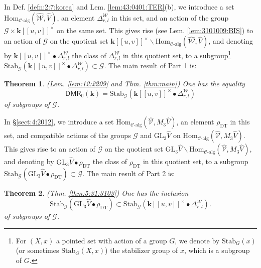 \documentclass[10pt]{amsart}
\newtheorem{thm}{Theorem}[section]
\numberwithin{equation}{subsection}
\begin{document}
In Def. \ref{defn:2:7:korea} and Lem. \ref{lem:43:0401:TER}(b), we introduce a set $\mathrm{Hom}_{\mathcal C\text{-alg}}(\hat{\mathcal W},\hat V)$, 
an element $\Delta^{\mathcal W}_{r,l}$ in this set, and an action of the group $\mathcal G\times\mathbf k[[u,v]]^\times$ on the same set. 
This gives rise (see Lem. \ref{lem:3101009:BIS}) to an action of $\mathcal G$ on the quotient set 
$\mathbf k[[u,v]]^\times\backslash\mathrm{Hom}_{\mathcal C\text{-alg}}
(\hat{\mathcal W},\hat V)$, and denoting by 
$\mathbf k[[u,v]]^\times\bullet\Delta^{\mathcal W}_{r,l}$ 
the class of $\Delta^{\mathcal W}_{r,l}$ in this quotient set, to a 
subgroup\footnote{For $(X,x)$ a pointed set with action of a group $G$, we denote by $\mathrm{Stab}_G(x)$ (or sometimes $\mathrm{Stab}_G(X,x)$)
the stabilizer group of $x$, which is a subgroup of $G$.} 
$\mathrm{Stab}_{\mathcal G}(\mathbf k[[u,v]]^\times\bullet\Delta^{\mathcal W}_{r,l}
)\subset\mathcal G$. The main result of Part 1 is: 
\begin{thm} \label{thm:013}(Lem. \ref{lem:12:2209} and Thm. \ref{thm:main}) %
One has the equality 
$$
\mathsf{DMR}_0(\mathbf k)=\mathrm{Stab}_{\mathcal G}(\mathbf k[[u,v]]^\times\bullet\Delta^{\mathcal W}_{r,l}
) 
$$
of subgroups of $\mathcal G$. 
\end{thm}

In §\ref{sect:4:2012}, we introduce a set $\mathrm{Hom}_{\mathcal C\text{-alg}}(\hat{\mathcal V},M_3\hat V)$, 
an element $\rho_{\mathrm{DT}}$ in this set, and compatible actions of the groups $\mathcal G$ and $\mathrm{GL}_3\hat V$
on $\mathrm{Hom}_{\mathcal C\text{-alg}}(\hat{\mathcal V},M_3\hat V)$. 
 This gives rise to an action of $\mathcal G$ on the quotient set $\mathrm{GL}_3\hat V\backslash
\mathrm{Hom}_{\mathcal C\text{-alg}}(\hat{\mathcal V},M_3\hat V)$, and denoting by 
$\mathrm{GL}_3\hat V\bullet \rho_{\mathrm{DT}}
$ the class 
of $\rho_{\mathrm{DT}}$ in this quotient set, to a 
subgroup $\mathrm{Stab}_{\mathcal G}(\mathrm{GL}_3\hat V\bullet \rho_{\mathrm{DT}}
)\subset\mathcal G$. The 
main result of Part 2 is: 

\begin{thm} \label{thm:015}(Thm. \ref{thm:5:31:3103}) %
One has the inclusion
$$
\mathrm{Stab}_{\mathcal G}(\mathrm{GL}_3\hat V\bullet \rho_{\mathrm{DT}}
)\subset 
\mathrm{Stab}_{\mathcal G}(\mathbf k[[u,v]]^\times\bullet\Delta^{\mathcal W}_{r,l}
).
$$
of subgroups of $\mathcal G$.
\end{thm}
\end{document}
